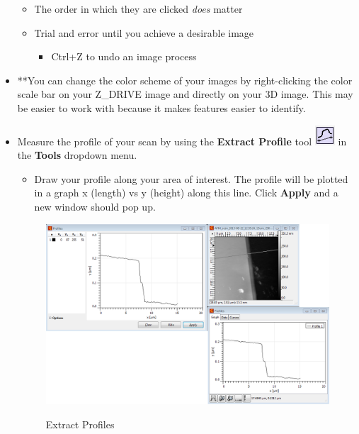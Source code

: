 \documentclass{../lab}
\begin{document}
\begin{itemize}
\begin{itemize}
        \item The order in which they are clicked \emph{does} matter
        
        \item Trial and error until you achieve a desirable image
        \begin{itemize}
            \item Ctrl+Z to undo an image process
        \end{itemize}
        
    \end{itemize}
    
    \item **You can change the color scheme of your images by right-clicking the color scale bar on your Z\_DRIVE image and directly on your 3D image.  This may be easier to work with because it makes features easier to identify.
    
    \item Measure the profile of your scan by using the \textbf{Extract Profile} tool \includegraphics[height=2em]{images/profiles.png} in the \textbf{Tools} dropdown menu.
    \begin{itemize}
        \item Draw your profile along your area of interest.  The profile will be plotted in a graph x (length) vs y (height) along this line. Click \textbf{Apply} and a new window should pop up.
    \end{itemize}
    
    \begin{figure}[H]
        \centering
        \href{http://experimentationlab.berkeley.edu/sites/default/files/AFMImages/49.png}{\includegraphics[width=0.65\linewidth]{images/49.png}}
        \caption{Extract Profiles}
    \end{figure}
    

\end{itemize}
\end{document}
